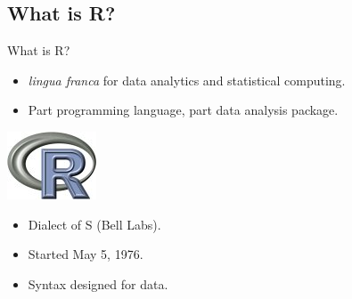 \subsection{What is R?}
\makesubcontentsslidessec


\begin{frame}
  \begin{block}{What is R?}\pause
  \begin{minipage}{.75\textwidth}
  \begin{itemize}[<+-|alert@+>]
    \item \emph{lingua franca} for data analytics and statistical computing.
    \item Part programming language, part data analysis package.
  \end{itemize}
  \end{minipage}
  \hfill
  \begin{minipage}{.2\textwidth}
    \centering\includegraphics[scale=2]{../common/pics/Rlogo}
  \end{minipage}
  \begin{itemize}
    \item Dialect of S (Bell Labs).
    \item Started May 5, 1976.
    \item Syntax designed for data.
  \end{itemize}
\end{block}
\end{frame}

